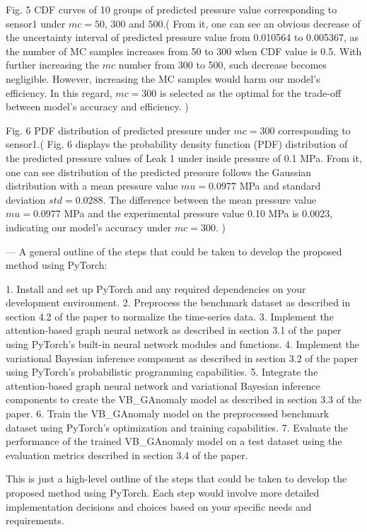 Fig. 5 CDF curves of 10 groups of predicted pressure value corresponding to sensor1 under $mc=50$, $300$ and $500$.(
From it, one can see an obvious decrease of the uncertainty interval of predicted pressure value from 0.010564 to 0.005367, as the number of MC samples increases from 50 to 300 when CDF value is 0.5. With further increasing the $mc$ number from 300 to 500, such decrease becomes negligible. However, increasing the MC samples would harm our model’s efficiency. In this regard, $mc=300$ is selected as the optimal for the trade-off between model’s accuracy and efficiency.
)

Fig. 6 PDF distribution of predicted pressure under $mc=300$ corresponding to sensor1.(
Fig. 6 displays the probability density function (PDF) distribution of the predicted pressure values of Leak 1 under inside pressure of 0.1 MPa. From it, one can see distribution of the predicted pressure follows the Gaussian distribution with a mean pressure value $mu=0.0977$ MPa and standard deviation $std=0.0288$. The difference between the mean pressure value $mu=0.0977$ MPa and the experimental pressure value 0.10 MPa is 0.0023, indicating our model’s accuracy under $mc=300$.
)

---
A general outline of the steps that could be taken to develop the proposed method using PyTorch:

1. Install and set up PyTorch and any required dependencies on your development environment.
2. Preprocess the benchmark dataset as described in section 4.2 of the paper to normalize the time-series data.
3. Implement the attention-based graph neural network as described in section 3.1 of the paper using PyTorch’s built-in neural network modules and functions.
4. Implement the variational Bayesian inference component as described in section 3.2 of the paper using PyTorch’s probabilistic programming capabilities.
5. Integrate the attention-based graph neural network and variational Bayesian inference components to create the VB_GAnomaly model as described in section 3.3 of the paper.
6. Train the VB_GAnomaly model on the preprocessed benchmark dataset using PyTorch’s optimization and training capabilities.
7. Evaluate the performance of the trained VB_GAnomaly model on a test dataset using the evaluation metrics described in section 3.4 of the paper.

This is just a high-level outline of the steps that could be taken to develop the proposed method using PyTorch. Each step would involve more detailed implementation decisions and choices based on your specific needs and requirements.


